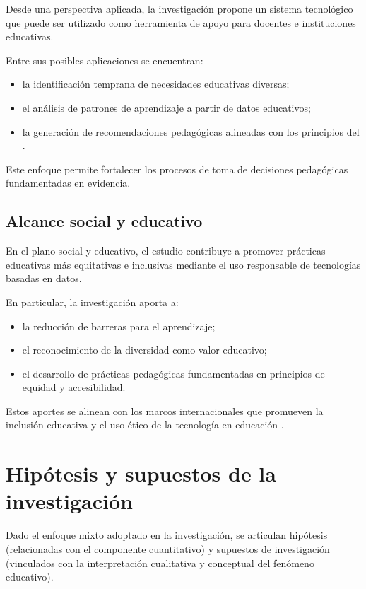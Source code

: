 \begin{refsection}
Desde una perspectiva aplicada, la investigación propone un sistema tecnológico que puede ser utilizado como herramienta de apoyo para docentes e instituciones educativas.

Entre sus posibles aplicaciones se encuentran:

\begin{itemize}
\item la identificación temprana de necesidades educativas diversas;
\item el análisis de patrones de aprendizaje a partir de datos educativos;
\item la generación de recomendaciones pedagógicas alineadas con los principios del \DUA.
\end{itemize}

Este enfoque permite fortalecer los procesos de toma de decisiones pedagógicas fundamentadas en evidencia.

\subsection{Alcance social y educativo}

En el plano social y educativo, el estudio contribuye a promover prácticas educativas más equitativas e inclusivas mediante el uso responsable de tecnologías basadas en datos.

En particular, la investigación aporta a:

\begin{itemize}
\item la reducción de barreras para el aprendizaje;
\item el reconocimiento de la diversidad como valor educativo;
\item el desarrollo de prácticas pedagógicas fundamentadas en principios de equidad y accesibilidad.
\end{itemize}

Estos aportes se alinean con los marcos internacionales que promueven la inclusión educativa y el uso ético de la tecnología en educación \parencite{unesco2020}.

\section{Hipótesis y supuestos de la investigación}

Dado el enfoque mixto adoptado en la investigación, se articulan hipótesis (relacionadas con el componente cuantitativo) y supuestos de investigación (vinculados con la interpretación cualitativa y conceptual del fenómeno educativo).


\end{refsection}
